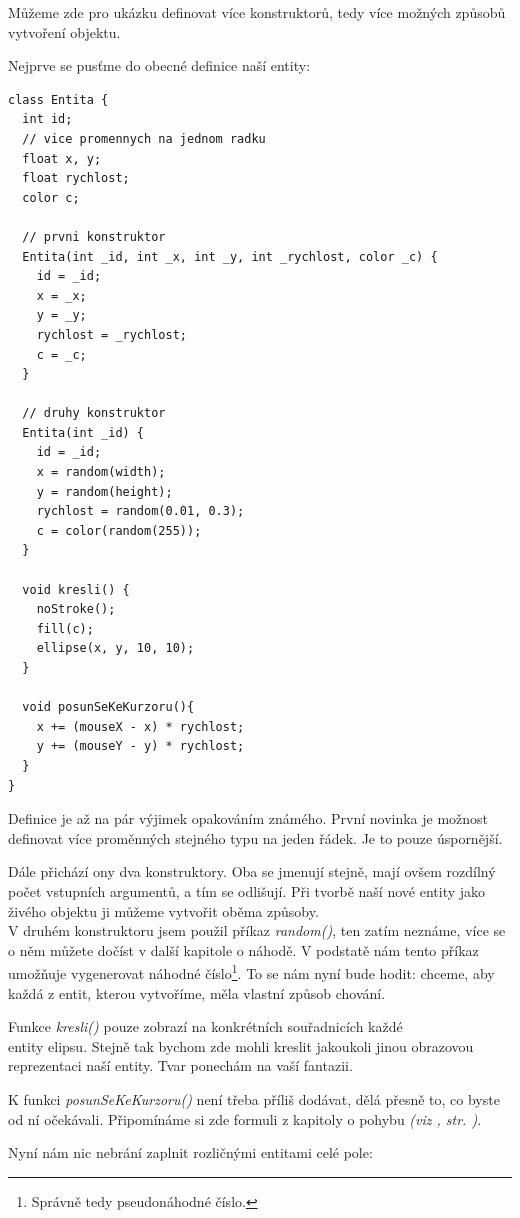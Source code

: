 \documentclass[10pt,twoside=true,open=right,cleardoublepage=empty,chapterprefix=true]{scrbook}
\newcommand{\vyraz}[1]{\textit{\gls{#1}}\index{#1}\label{#1}}
\newcommand{\odkaz}[1]{\textit{(viz \nameref{#1}, str. \pageref*{#1})}}
\begin{document}
Můžeme zde pro ukázku definovat více konstruktorů, tedy více možných způsobů vytvoření objektu.

Nejprve se pusťme do obecné definice naší entity:

\begin{lstlisting}
class Entita {
  int id;
  // vice promennych na jednom radku
  float x, y;
  float rychlost;
  color c;

  // prvni konstruktor
  Entita(int _id, int _x, int _y, int _rychlost, color _c) {
    id = _id;
    x = _x;
    y = _y;
    rychlost = _rychlost;
    c = _c;
  }

  // druhy konstruktor
  Entita(int _id) {
    id = _id;
    x = random(width);
    y = random(height);
    rychlost = random(0.01, 0.3);
    c = color(random(255));
  }

  void kresli() {
    noStroke();
    fill(c);
    ellipse(x, y, 10, 10);
  }
  
  void posunSeKeKurzoru(){
    x += (mouseX - x) * rychlost;
    y += (mouseY - y) * rychlost;
  }
}

\end{lstlisting}

Definice je až na pár výjimek opakováním známého. První novinka je možnost definovat více proměnných stejného typu na jeden řádek. Je to pouze úspornější.

 Dále přichází ony dva konstruktory. Oba se jmenují stejně, mají ovšem rozdílný počet vstupních argumentů, a tím se odlišují. Při tvorbě naší nové entity jako živého objektu ji můžeme vytvořit oběma způsoby. \\V druhém konstruktoru jsem použil příkaz \vyraz{random()}, ten zatím neznáme, více se o něm můžete dočíst v další kapitole o náhodě. V podstatě nám tento příkaz umožňuje vygenerovat náhodné číslo\footnote{Správně tedy pseudonáhodné číslo.}. To se nám nyní bude hodit: chceme, aby každá z entit, kterou vytvoříme, měla vlastní způsob chování.
 
Funkce {\em kresli()} pouze zobrazí na konkrétních souřadnicích každé \\entity elipsu. Stejně tak bychom zde mohli kreslit jakoukoli jinou obrazovou reprezentaci naší entity. Tvar ponechám na vaší fantazii.
 
K funkci {\em posunSeKeKurzoru()} není třeba příliš dodávat, dělá přesně to, co byste od ní očekávali. Připomínáme si zde formuli z kapitoly o pohybu \odkaz{Dynamika pohybu}.

Nyní nám nic nebrání zaplnit rozličnými entitami celé pole:
\end{document}
